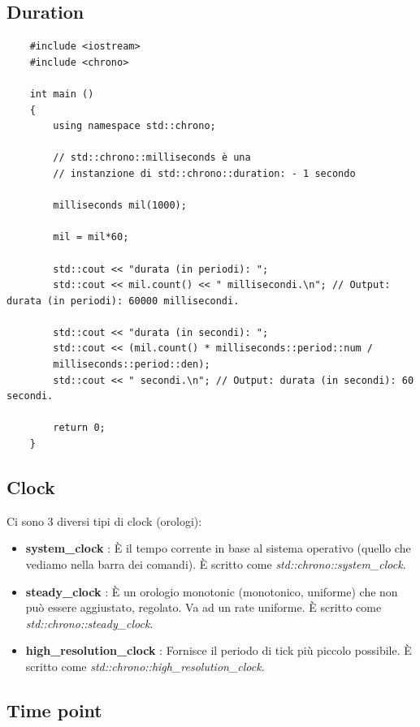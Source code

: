 \subsection{Duration}

\begin{lstlisting}
	#include <iostream>
	#include <chrono>	
	
	int main ()
	{
		using namespace std::chrono;
		
		// std::chrono::milliseconds è una
		// instanzione di std::chrono::duration: - 1 secondo
		
		milliseconds mil(1000);
		
		mil = mil*60;
		
		std::cout << "durata (in periodi): ";
		std::cout << mil.count() << " millisecondi.\n"; // Output: durata (in periodi): 60000 millisecondi.
		
		std::cout << "durata (in secondi): ";
		std::cout << (mil.count() * milliseconds::period::num /
		milliseconds::period::den);
		std::cout << " secondi.\n"; // Output: durata (in secondi): 60 secondi.
		
		return 0;
	}
\end{lstlisting}

\subsection{Clock}

\textsf{\small Ci sono 3 diversi tipi di clock (orologi): } \\

\begin{itemize}
	\item \textsf{\small \textbf{system\_clock} : È il tempo corrente in base al sistema operativo (quello che vediamo nella barra dei comandi). È scritto come \emph{std::chrono::system\_clock}.}
	\item \textsf{\small \textbf{steady\_clock} : È un orologio monotonic (monotonico, uniforme) che non può essere aggiustato, regolato. Va ad un rate uniforme. È scritto come \emph{std::chrono::steady\_clock}.}
	\item \textsf{\small \textbf{high\_resolution\_clock} : Fornisce il periodo di tick più piccolo possibile. È scritto come \emph{std::chrono::high\_resolution\_clock}.}
\end{itemize}

\subsection{Time point}

